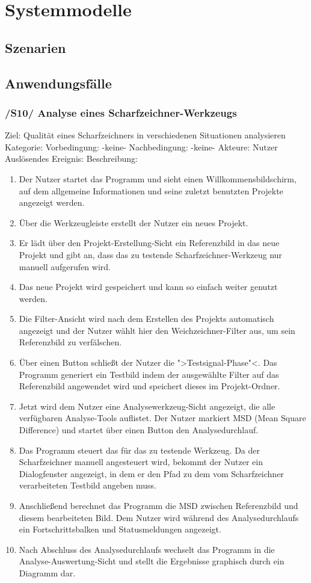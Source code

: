 \chapter{Systemmodelle}
\section{Szenarien}
\section{Anwendungsfälle}
\subsection{/S10/ Analyse eines Scharfzeichner-Werkzeugs}
Ziel: Qualität eines Scharfzeichners in verschiedenen Situationen analysieren
Kategorie: 
Vorbedingung: -keine-
Nachbedingung: -keine-
Akteure: Nutzer
Auslösendes Ereignis: 
Beschreibung:

\begin{enumerate}
\item Der Nutzer startet das Programm und sieht einen Willkommensbildschirm, auf dem allgemeine Informationen und seine zuletzt benutzten Projekte angezeigt werden.
\item Über die Werkzeugleiste erstellt der Nutzer ein neues Projekt.
\item Er lädt über den Projekt-Erstellung-Sicht ein Referenzbild in das neue Projekt und gibt an, dass das zu testende Scharfzeichner-Werkzeug nur manuell aufgerufen wird.
\item Das neue Projekt wird gespeichert und kann so einfach weiter genutzt werden.

\item Die Filter-Ansicht wird nach dem Erstellen des Projekts automatisch angezeigt und der Nutzer wählt hier den Weichzeichner-Filter aus, um sein Referenzbild zu verfälschen.
\item Über einen Button schließt der Nutzer die ">Testsignal-Phase"<. Das Programm generiert ein Testbild indem der ausgewählte Filter auf das Referenzbild angewendet wird und speichert dieses im Projekt-Ordner.
\item Jetzt wird dem Nutzer eine Analysewerkzeug-Sicht angezeigt, die alle verfügbaren Analyse-Tools auflistet. Der Nutzer markiert MSD (Mean Square Difference) und startet über einen Button den Analysedurchlauf.
\item Das Programm steuert das für das zu testende Werkzeug. Da der Scharfzeichner manuell angesteuert wird, bekommt der Nutzer ein Dialogfenster angezeigt, in dem er den Pfad zu dem vom Scharfzeichner verarbeiteten Testbild angeben muss.
\item Anschließend berechnet das Programm die MSD zwischen Referenzbild und diesem bearbeiteten Bild. Dem Nutzer wird während des Analysedurchlaufs ein Fortschrittsbalken und Statusmeldungen angezeigt.
\item Nach Abschluss des Analysedurchlaufs wechselt das Programm in die Analyse-Auswertung-Sicht und stellt die Ergebnisse graphisch durch ein Diagramm dar.
\end{enumerate}


